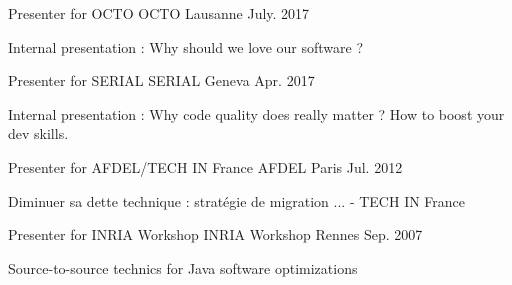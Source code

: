 

\begin{cventries}
    
\cventry
{Presenter for OCTO} %
{OCTO} %
{Lausanne} %
{July. 2017} %
{
    \begin{cvitems} %
        \item {Internal presentation : Why should we love our software ?}
    \end{cvitems}
}

\cventry
{Presenter for SERIAL} %
{SERIAL} %
{Geneva} %
{Apr. 2017} %
{
    \begin{cvitems} %
        \item {Internal presentation : Why code quality does really matter ? How to boost your dev skills.}
    \end{cvitems}
}
 
  \cventry
    {Presenter for AFDEL/TECH IN France} %
    {AFDEL} %
    {Paris} %
    {Jul. 2012} %
    {
      \begin{cvitems} %
        \item {Diminuer sa dette technique : stratégie de migration ... - TECH IN France}
      \end{cvitems}
    }

  \cventry
    {Presenter for INRIA Workshop} %
    {INRIA Workshop} %
    {Rennes} %
    {Sep. 2007} %
    {
      \begin{cvitems} %
        \item {Source-to-source technics for Java software optimizations}
      \end{cvitems}
    }

\end{cventries}
